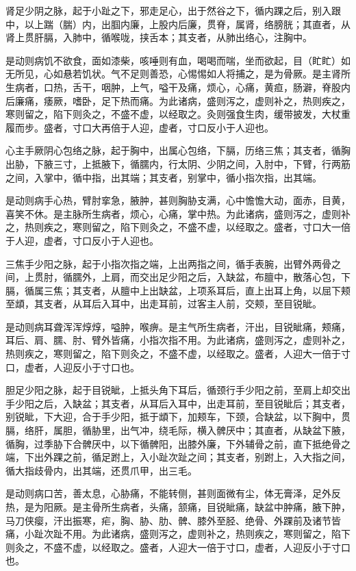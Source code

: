 \documentclass[a4paper,12pt,UTF8,twoside]{ctexbook}
\begin{document}
	肾足少阴之脉，起于小趾之下，邪走足心，出于然谷之下，循内踝之后，别入跟中，以上踹（腨）内，出腘内廉，上股内后廉，贯脊，属肾，络膀胱；其直者，从肾上贯肝膈，入肺中，循喉咙，挟舌本；其支者，从肺出络心，注胸中。
	
	是动则病饥不欲食，面如漆柴，咳唾则有血，喝喝而喘，坐而欲起，目（盳盳）如无所见，心如悬若饥状。气不足则善恐，心惕惕如人将捕之，是为骨厥。是主肾所生病者，口热，舌干，咽肿，上气，嗌干及痛，烦心，心痛，黄疸，肠澼，脊股内后廉痛，痿厥，嗜卧，足下热而痛。为此诸病，盛则泻之，虚则补之，热则疾之，寒则留之，陷下则灸之，不盛不虚，以经取之。灸则强食生肉，缓带披发，大杖重履而步。盛者，寸口大再倍于人迎，虚者，寸口反小于人迎也。
	
	心主手厥阴心包络之脉，起于胸中，出属心包络，下膈，历络三焦；其支者，循胸出胁，下腋三寸，上抵腋下，循臑内，行太阴、少阴之间，入肘中，下臂，行两筋之间，入掌中，循中指，出其端；其支者，别掌中，循小指次指，出其端。
	
	是动则病手心热，臂肘挛急，腋肿，甚则胸胁支满，心中憺憺大动，面赤，目黄，喜笑不休。是主脉所生病者，烦心，心痛，掌中热。为此诸病，盛则泻之，虚则补之，热则疾之，寒则留之，陷下则灸之，不盛不虚，以经取之。盛者，寸口大一倍于人迎，虚者，寸口反小于人迎也。
	
	三焦手少阳之脉，起于小指次指之端，上出两指之间，循手表腕，出臂外两骨之间，上贯肘，循臑外，上肩，而交出足少阳之后，入缺盆，布膻中，散落心包，下膈，循属三焦；其支者，从膻中上出缺盆，上项系耳后，直上出耳上角，以屈下颊至䪼，其支者，从耳后入耳中，出走耳前，过客主人前，交颊，至目锐眦。
	
	是动则病耳聋浑浑焞焞，嗌肿，喉痹。是主气所生病者，汗出，目锐眦痛，颊痛，耳后、肩、臑、肘、臂外皆痛，小指次指不用。为此诸病，盛则泻之，虚则补之，热则疾之，寒则留之，陷下则灸之，不盛不虚，以经取之。盛者，人迎大一倍于寸口，虚者，人迎反小于寸口也。
	
	胆足少阳之脉，起于目锐眦，上抵头角下耳后，循颈行手少阳之前，至肩上却交出手少阳之后，入缺盆；其支者，从耳后入耳中，出走耳前，至目锐眦后；其支者，别锐眦，下大迎，合于手少阳，抵于䪼下，加颊车，下颈，合缺盆，以下胸中，贯膈，络肝，属胆，循胁里，出气冲，绕毛际，横入髀厌中；其直者，从缺盆下腋，循胸，过季胁下合髀厌中，以下循髀阳，出膝外廉，下外辅骨之前，直下抵绝骨之端，下出外踝之前，循足跗上，入小趾次趾之间；其支者，别跗上，入大指之间，循大指歧骨内，出其端，还贯爪甲，出三毛。
	
	是动则病口苦，善太息，心胁痛，不能转侧，甚则面微有尘，体无膏泽，足外反热，是为阳厥。是主骨所生病者，头痛，颔痛，目锐眦痛，缺盆中肿痛，腋下肿，马刀侠瘿，汗出振寒，疟，胸、胁、肋、髀、膝外至胫、绝骨、外踝前及诸节皆痛，小趾次趾不用。为此诸病，盛则泻之，虚则补之，热则疾之，寒则留之，陷下则灸之，不盛不虚，以经取之。盛者，人迎大一倍于寸口，虚者，人迎反小于寸口也。
	
\end{document}
